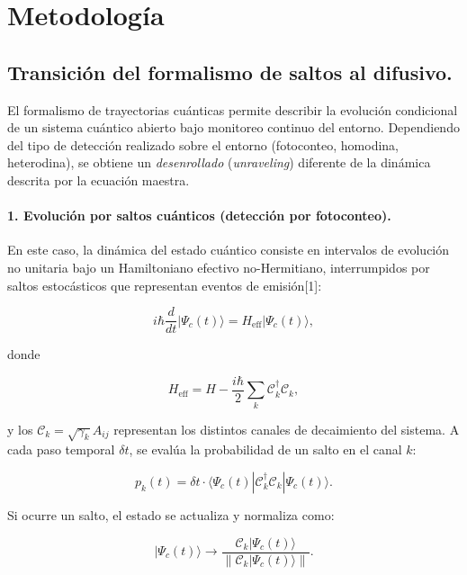 \documentclass[12pt]{report}
\begin{document}
\section*{Metodología}
\subsection*{Transición del formalismo de saltos al difusivo.}

El formalismo de trayectorias cuánticas permite describir la evolución condicional de un sistema cuántico abierto bajo monitoreo continuo del entorno. Dependiendo del tipo de detección realizado sobre el entorno (fotoconteo, homodina, heterodina), se obtiene un \textit{desenrollado} (\textit{unraveling}) diferente de la dinámica descrita por la ecuación maestra.

\paragraph{1. Evolución por saltos cuánticos (detección por fotoconteo).}

En este caso, la dinámica del estado cuántico consiste en intervalos de evolución no unitaria bajo un Hamiltoniano efectivo no-Hermitiano, interrumpidos por saltos estocásticos que representan eventos de emisión[1]:

\begin{equation}
i\hbar \frac{d}{dt}|\Psi_c(t)\rangle = H_{\mathrm{eff}} |\Psi_c(t)\rangle,
\end{equation}

donde

\begin{equation}
H_{\mathrm{eff}} = H - \frac{i\hbar}{2} \sum_k \mathcal{C}_k^\dagger \mathcal{C}_k,
\end{equation}

y los \( \mathcal{C}_k = \sqrt{\gamma_k} A_{ij} \) representan los distintos canales de decaimiento del sistema. A cada paso temporal \( \delta t \), se evalúa la probabilidad de un salto en el canal \( k \):

\begin{equation}
p_k(t) = \delta t \cdot \langle \Psi_c(t) | \mathcal{C}_k^\dagger \mathcal{C}_k | \Psi_c(t) \rangle.
\end{equation}

Si ocurre un salto, el estado se actualiza y normaliza como:

\[
|\Psi_c(t)\rangle \rightarrow \frac{\mathcal{C}_k |\Psi_c(t)\rangle}{\|\mathcal{C}_k |\Psi_c(t)\rangle\|}.
\]
\end{document}
